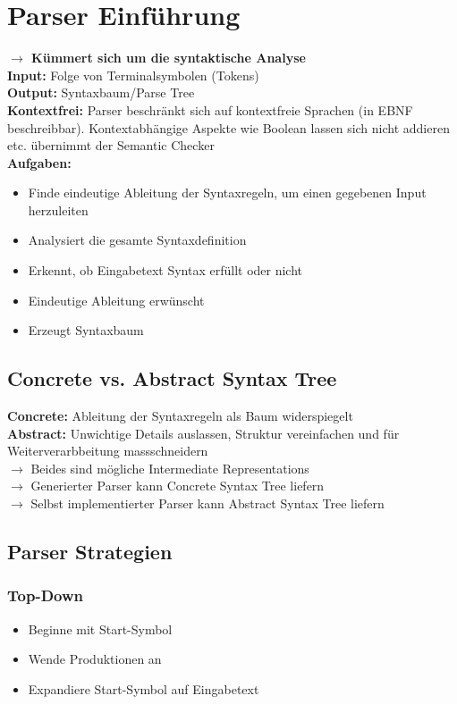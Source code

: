 
\section{Parser Einführung}
\textbf{$\rightarrow$ Kümmert sich um die syntaktische Analyse}\\
\textbf{Input:} Folge von Terminalsymbolen (Tokens)\\
\textbf{Output:} Syntaxbaum/Parse Tree\\
\textbf{Kontextfrei:} Parser beschränkt sich auf kontextfreie Sprachen (in EBNF beschreibbar). Kontextabhängige Aspekte wie Boolean lassen sich nicht addieren etc. übernimmt der Semantic Checker\\
\textbf{Aufgaben:}
\begin{itemize}[topsep=0pt]
    \itemsep -0.2em
    \item Finde eindeutige Ableitung der Syntaxregeln, um einen gegebenen Input herzuleiten
    \item Analysiert die gesamte Syntaxdefinition
    \item Erkennt, ob Eingabetext Syntax erfüllt oder nicht
    \item Eindeutige Ableitung erwünscht
    \item Erzeugt Syntaxbaum
\end{itemize}

\subsection{Concrete vs. Abstract Syntax Tree}
\textbf{Concrete:} Ableitung der Syntaxregeln als Baum widerspiegelt\\
\textbf{Abstract:} Unwichtige Details auslassen, Struktur vereinfachen und für Weiterverarbbeitung massschneidern\\
$\rightarrow$ Beides sind mögliche Intermediate Representations\\
$\rightarrow$ Generierter Parser kann Concrete Syntax Tree liefern\\
$\rightarrow$ Selbst implementierter Parser kann Abstract Syntax Tree liefern

\subsection{Parser Strategien}
\subsubsection{Top-Down}
\begin{itemize}[topsep=0pt]
    \itemsep -0.2em
    \item Beginne mit Start-Symbol
    \item Wende Produktionen an
    \item Expandiere Start-Symbol auf Eingabetext
\end{itemize}

